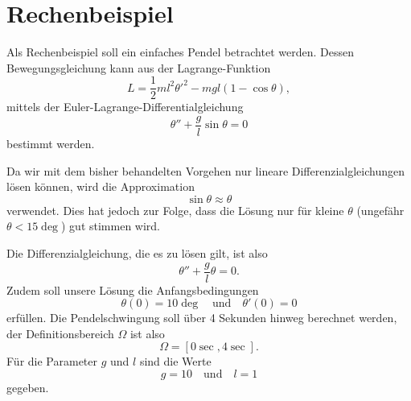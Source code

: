 %
%
%
%
\section{Rechenbeispiel\label{fem:rechenbsp}}
Als Rechenbeispiel soll ein einfaches Pendel betrachtet werden. 
Dessen Bewegungsgleichung kann aus der Lagrange-Funktion
\begin{equation*}
    L = \frac{1}{2} m l^2 {\theta'}^2 - m g l (1 - \cos \theta),
\end{equation*}
mittels der Euler-Lagrange-Differentialgleichung
\begin{equation*}
    \theta'' + \frac{g}{l} \sin \theta = 0
\end{equation*}
bestimmt werden.

Da wir mit dem bisher behandelten Vorgehen nur lineare Differenzialgleichungen lösen können, wird die Approximation
\begin{equation*}
    \sin \theta \approx \theta
\end{equation*}
verwendet.
Dies hat jedoch zur Folge, dass die Lösung nur für kleine $\theta$
(ungefähr $\theta < 15 \deg$) gut stimmen wird.

Die Differenzialgleichung, die es zu lösen gilt, ist also
\begin{equation*}
    \theta'' + \frac{g}{l} \theta = 0.
\end{equation*}
Zudem soll unsere Lösung die Anfangsbedingungen
\begin{equation*}
    \theta(0) = 10 \deg
    \quad \text{und} \quad
    \theta'(0) = 0
\end{equation*}
erfüllen.
Die Pendelschwingung soll über 4 Sekunden hinweg berechnet werden, der Definitionsbereich $\Omega$ ist also
\begin{equation*}
    \Omega = [0\sec, 4\sec].
\end{equation*}
Für die Parameter $g$ und $l$ sind die Werte
\begin{equation*}
    g = 10
    \quad \text{und} \quad
    l = 1
\end{equation*}
gegeben.


